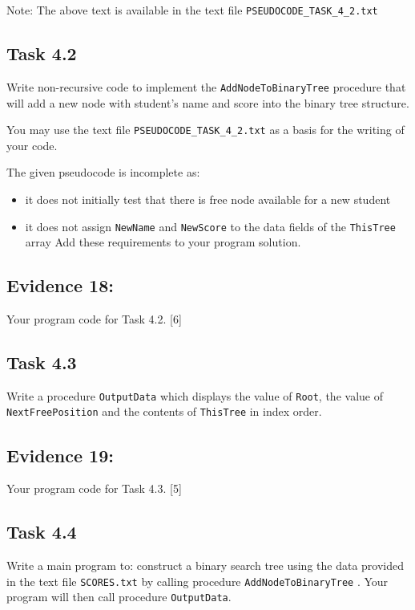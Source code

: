 Note: The above text is available in the text file \texttt{PSEUDOCODE\_TASK\_4\_2.txt} 

\subsection*{Task 4.2 }

Write non-recursive code to implement the \texttt{AddNodeToBinaryTree}
procedure that will add a new node with student\textquoteright s name
and score into the binary tree structure. 

You may use the text file \texttt{PSEUDOCODE\_TASK\_4\_2.txt} as a
basis for the writing of your code. 

The given pseudocode is incomplete as: 
\begin{itemize}
\item it does not initially test that there is free node available for a
new student 
\item it does not assign \texttt{NewName} and \texttt{NewScore} to the data
fields of the \texttt{ThisTree} array Add these requirements to your
program solution.
\end{itemize}

\subsection*{Evidence 18: }

Your program code for Task 4.2. \hfill{} {[}6{]}

\subsection*{Task 4.3 }

Write a procedure \texttt{OutputData} which displays the value of
\texttt{Root}, the value of \texttt{NextFreePosition} and the contents
of \texttt{ThisTree} in index order.

\subsection*{Evidence 19: }

Your program code for Task 4.3. \hfill{}{[}5{]}

\subsection*{Task 4.4 }

Write a main program to: construct a binary search tree using the
data provided in the text file \texttt{SCORES.txt} by calling procedure
\texttt{AddNodeToBinaryTree} . Your program will then call procedure
\texttt{OutputData}. 

